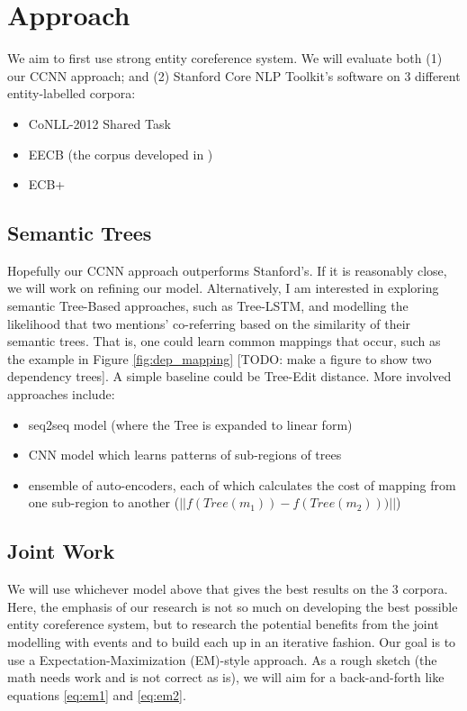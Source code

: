 \section{Approach}
We aim to first use strong entity coreference system.  We will evaluate both (1) our CCNN approach; and (2) Stanford Core NLP Toolkit's software on 3 different entity-labelled corpora:
\begin{itemize}
\item CoNLL-2012 Shared Task
\item EECB (the corpus developed in \cite{Lee:2012:JEE:2390948.2391006})
\item ECB+
\end{itemize}

\subsection{Semantic Trees}
Hopefully our CCNN approach outperforms Stanford's.  If it is reasonably close, we will work on refining our model.  Alternatively, I am interested in exploring semantic Tree-Based approaches, such as Tree-LSTM, and modelling the likelihood that two mentions' co-referring based on the similarity of their semantic trees.  That is, one could learn common mappings that occur, such as the example in Figure \ref{fig:dep_mapping} [TODO: make a figure to show two dependency trees].  A simple baseline could be Tree-Edit distance.  More involved approaches include:
\begin{itemize}
\item seq2seq model (where the Tree is expanded to linear form)
\item CNN model which learns patterns of sub-regions of trees
\item ensemble of auto-encoders, each of which calculates the cost of mapping from one sub-region to another ($||f(Tree(m_{1})) - f(Tree(m_{2})))||$)
\end{itemize}

\subsection{Joint Work}
We will use whichever model above that gives the best results on the 3 corpora.  Here, the emphasis of our research is not so much on developing the best possible entity coreference system, but to research the potential benefits from the joint modelling with events and to build each up in an iterative fashion.  Our goal is to use a Expectation-Maximization (EM)-style approach.  As a rough sketch (the math needs work and is not correct as is), we will aim for a back-and-forth like equations \ref{eq:em1} and \ref{eq:em2}.

